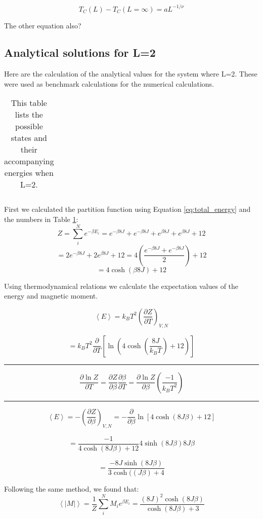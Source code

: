 \begin{equation}\label{eq:critical_T}
T_C(L) - T_C(L=\infty) = a L^{-1/\nu}
\end{equation}

The other equation also?


\subsection{Analytical solutions for L=2}\label{sec:analytical_sol}

Here are the calculation of the analytical values for the system where L=2. These were used as benchmark calculations for the numerical calculations.

\begin{table}[H]
	\caption{This table lists the possible states and their accompanying energies when L=2.}
	\label{tab:macro_energies}
\begin{tabular}{cccccc}
	
\end{tabular}
\end{table}

First we calculated the partition function using Equation \ref{eq:total_energy} and the numbers in Table \ref{tab:macro_energies}:
\[
Z = \sum_i^N e^{-\beta E_i} = e^{-\beta 8 J} + e^{-\beta 8 J} + e^{\beta 8 J}+e^{\beta 8 J} + 12
\]
\[
= 2e^{-\beta 8 J}+ 2e^{\beta 8 J} + 12 = 4\left(\frac{e^{-\beta 8 J}+ e^{-\beta 8 J}}{2}\right)+12
\]
\[
= 4 \cosh\left( \beta 8 J \right) + 12
\]

Using thermodynamical relations we calculate the expectation values of the energy and magnetic moment\cite{Thermal}.

\[
\left< E \right> = k_B T^2 \left(\frac{\partial Z}{\partial T}
\right)_{V,N}
\]

\[
= k_B T^2 \frac{\partial}{\partial T} \left[\ln \left(4\cosh \left(\frac{8J}{k_BT}\right) +12\right) \right]\]
\hrule
\[
\frac{\partial \ln Z}{\partial T} = \frac{\partial Z}{\partial \beta}\frac{\partial \beta}{\partial T} = \frac{\partial \ln Z}{\partial \beta}\left(\frac{-1}{k_B T^2}\right)
\]
\hrule
\[
\left< E\right> = -\left(\frac{\partial Z}{\partial \beta} \right)_{V,N} = - \frac{\partial}{\partial \beta} \ln \left[ 4 \cosh \left( 8J\beta\right)+12\right]
\]

\[
= \frac{-1}{4\cosh (8J\beta) + 12}4 \sinh(8J\beta)8J\beta
\]

\[
= \frac{-8J \sinh(8J\beta)}{3\cosh((J\beta)+ 4}
\]

Following the same method, we found that:
\[
\left< |M| \right> = \frac{1}{Z} \sum_i^N M_i e^{\beta E_i}  = \frac{(8J)^2 \cosh(8J\beta )}{\cosh (8J\beta ) + 3}
\]

